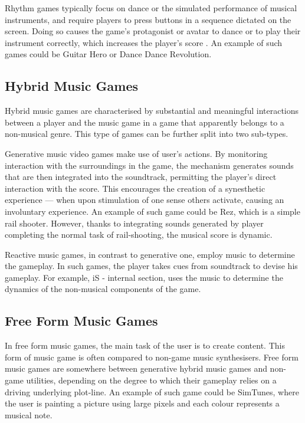Rhythm games typically focus on dance or the simulated performance of musical instruments, and require players to press buttons in a sequence dictated on the screen. Doing so causes the game's protagonist or avatar to dance or to play their instrument correctly, which increases the player's score \cite{rhythmgame}. An example of such games could be Guitar Hero or Dance Dance Revolution.

\vspace{10pt}


\subsection{Hybrid Music Games}

Hybrid music games are characterised by substantial and meaningful interactions between a player and the music game in a game that apparently belongs to a non-musical genre. This type of games can be further split into two sub-types.


Generative music video games make use of user’s actions. By monitoring interaction with the surroundings in the game, the mechanism generates sounds that are then integrated into the soundtrack, permitting the player’s direct interaction with the score. This encourages the creation of a synesthetic experience — when upon stimulation of one sense others activate, causing an involuntary experience. An example of such game could be Rez, which is a simple rail shooter. However, thanks to integrating sounds generated by player completing the normal task of rail-shooting, the musical score is dynamic.

Reactive music games, in contrast to generative one, employ music to determine the gameplay. In such games, the player takes cues from soundtrack to devise his gameplay. For example, iS - internal section, uses the music to determine the dynamics of the non-musical components of the game.

\vspace{10pt}


\subsection{Free Form Music Games}

In free form music games, the main task of the user is to create content. This form of music game is often compared to non-game music synthesisers. Free form music games are somewhere between generative hybrid music games and non-game utilities, depending on the degree to which their gameplay relies on a driving underlying plot-line. An example of such game could be SimTunes, where the user is painting a picture using large pixels and each colour represents a musical note. 

